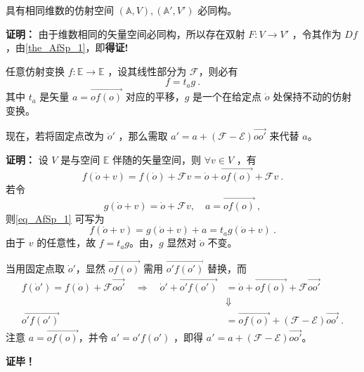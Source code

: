\begin{corollary}{}
具有相同维数的仿射空间 $(\mathbb A,V),(\mathbb A',V')$ 必同构。
\end{corollary}
\textbf{证明：} 由于维数相同的矢量空间必同构，所以存在双射 $F:V\rightarrow V'$ ，令其作为 $Df$ ，由\autoref{the_AfSp_1}，即\textbf{得证!}
\begin{theorem}{}
任意仿射变换 $f:\mathbb E\rightarrow\mathbb E$ ，设其线性部分为 $\mathcal F$，则必有
\begin{equation}
f=t_a g~.
\end{equation}
其中 $t_a$ 是矢量 $a=\overrightarrow{of(o)}$ 对应的平移，$g$ 是一个在给定点 $\dot o$ 处保持不动的仿射变换。

现在，若将固定点改为 $\dot o'$ ，那么需取 $a'=a+(\mathcal F-\mathcal E)\overrightarrow{oo'}$ 来代替 $a$。
\end{theorem}

\textbf{证明：} 设 $V$ 是与空间 $\mathbb E$ 伴随的矢量空间，则 $\forall v\in V$ ，有
\begin{equation}\label{eq_AfSp_1}
f(\dot o+v)=f(\dot o)+\mathcal F v=\dot o+\overrightarrow{of(o)}+\mathcal F v~.
\end{equation}
若令
\begin{equation}
g(\dot o+v)=\dot o+\mathcal F v,\quad a=\overrightarrow{of(o)}~,
\end{equation}
则\autoref{eq_AfSp_1} 可写为
\begin{equation}
f(\dot o+v)=g(\dot o+v)+a=t_a g(\dot o+v)~.
\end{equation}
由于 $v$ 的任意性，故 $f=t_ag$。由，$g$ 显然对 $\dot o$ 不变。

当用固定点取 $\dot o'$，显然 $\overrightarrow{of(o)}$ 需用 $\overrightarrow{o'f(o')}$ 替换，而
\begin{equation}
\begin{aligned}
f(\dot o')=f(\dot o)+\mathcal F \overrightarrow{oo'}\quad\Rightarrow \quad \dot o'+\overrightarrow{o'f(o')}&=\dot o+\overrightarrow{of(o)}+\mathcal F \overrightarrow{oo'}\\
&\Downarrow\\
\overrightarrow{o'f(o')}&=\overrightarrow{of(o)}+(\mathcal F-\mathcal E)\overrightarrow{oo'}~.
\end{aligned}
\end{equation}
注意 $a=\overrightarrow{of(o)}$，并令 $a'=o'f(o')$ ，即得 $a'=a+(\mathcal F-\mathcal E)\overrightarrow{oo'}$。

\textbf{证毕！}
